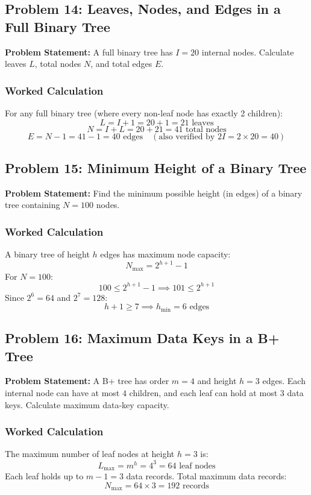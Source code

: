 \subsection{Problem 14: Leaves, Nodes, and Edges in a Full Binary Tree}

\textbf{Problem Statement:} A full binary tree has $I = 20$ internal nodes. Calculate leaves $L$, total nodes $N$, and total edges $E$.

\subsubsection*{Worked Calculation}
For any full binary tree (where every non-leaf node has exactly 2 children):
\[
L = I + 1 = 20 + 1 = \boxed{21 \text{ leaves}}
\]
\[
N = I + L = 20 + 21 = \boxed{41 \text{ total nodes}}
\]
\[
E = N - 1 = 41 - 1 = \boxed{40 \text{ edges}} \quad (\text{also verified by } 2I = 2 \times 20 = 40)
\]

\subsection{Problem 15: Minimum Height of a Binary Tree}

\textbf{Problem Statement:} Find the minimum possible height (in edges) of a binary tree containing $N = 100$ nodes.

\subsubsection*{Worked Calculation}
A binary tree of height $h$ edges has maximum node capacity:
\[
N_{\max} = 2^{h+1} - 1
\]
For $N = 100$:
\[
100 \leq 2^{h+1} - 1 \implies 101 \leq 2^{h+1}
\]
Since $2^6 = 64$ and $2^7 = 128$:
\[
h + 1 \geq 7 \implies \boxed{h_{\min} = 6 \text{ edges}}
\]

\subsection{Problem 16: Maximum Data Keys in a B+ Tree}

\textbf{Problem Statement:} A B+ tree has order $m = 4$ and height $h = 3$ edges. Each internal node can have at most $4$ children, and each leaf can hold at most $3$ data keys. Calculate maximum data-key capacity.

\subsubsection*{Worked Calculation}
The maximum number of leaf nodes at height $h = 3$ is:
\[
L_{\max} = m^h = 4^3 = 64 \text{ leaf nodes}
\]
Each leaf holds up to $m - 1 = 3$ data records. Total maximum data records:
\[
\boxed{N_{\max} = 64 \times 3 = 192 \text{ records}}
\]

